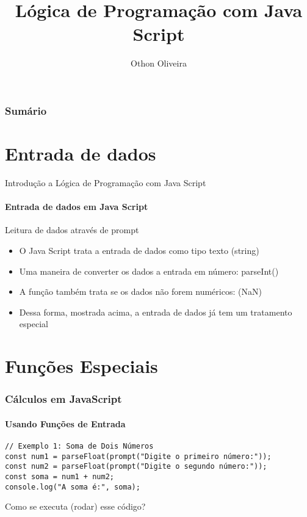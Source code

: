 \documentclass[13pt, xcolor={dvipsnames,svgnames}, portuguese]{beamer}
\author{Othon Oliveira}
\title{Lógica de Programação com Java Script}
\institute{SENAC - PROA}
\date{}
\begin{document}
\begin{frame}
\titlepage
\end{frame}

\newcommand{\capa}{
    \begin{tikzpicture}[remember picture,overlay]
        \node at (current page.south west)
            {\begin{tikzpicture}[remember picture, overlay]
                \fill[shading=radial,top color=orange,bottom color=orange,middle color=yellow] (0,0) rectangle (\paperwidth,\paperheight);
            \end{tikzpicture}
          };
    \end{tikzpicture}
}

\begin{frame}\frametitle{Sumário}
\tableofcontents
\end{frame}


\section{Entrada de dados}
\begin{frame}{Introdução a Lógica de Programação com Java Script}
\framesubtitle{ Entrada de dados em Java Script}
	\begin{block}{Leitura de dados através de prompt}
		\begin{itemize}
		  \item[a.] O Java Script trata a entrada de dados como tipo texto (string)
		  \pause
		  \item[b.] Uma maneira de converter os dados a entrada em número: parseInt()
		   \pause		  
		  \item[c.] A função também trata se os dados não forem numéricos: (NaN)
		  \pause
		  \item[d.] Dessa forma, mostrada acima, a entrada de dados já tem um tratamento especial
		\end{itemize}
	\end{block} 
\end{frame}


\section{Funções Especiais}

\begin{frame}[fragile]
\frametitle{Cálculos em JavaScript}
\framesubtitle{Usando Funções de Entrada}

\begin{verbatim}
// Exemplo 1: Soma de Dois Números
const num1 = parseFloat(prompt("Digite o primeiro número:"));
const num2 = parseFloat(prompt("Digite o segundo número:"));
const soma = num1 + num2;
console.log("A soma é:", soma);
\end{verbatim}
Como se executa (rodar) esse código?
\end{frame}
\end{document}
